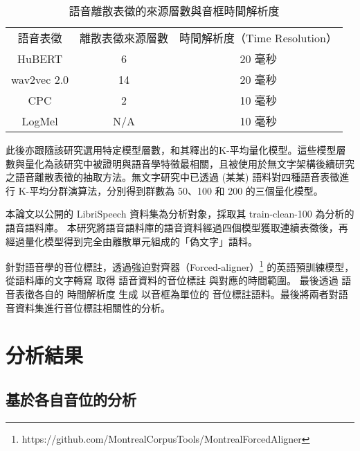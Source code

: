 \begin{table}
    \centering
    \begin{tabular}{ccc}
         語音表徵&  離散表徵來源層數& 時間解析度（Time Resolution）\\
         HuBERT      
&  6& 20 毫秒\\
         wav2vec 2.0 
&  14& 20 毫秒\\
         CPC         
&  2& 10 毫秒\\
         LogMel      &  N/A& 10 毫秒\\
    \end{tabular}
    \caption{語音離散表徵的來源層數與音框時間解析度}
    \label{tab:model-info}
\end{table}
此後亦跟隨該研究選用特定模型層數，和其釋出的K-平均量化模型。這些模型層數與量化為該研究中被證明與語音學特徵最相關，且被使用於無文字架構後續研究之語音離散表徵的抽取方法。無文字研究中已透過 (某某) 語料對四種語音表徵進行 K-平均分群演算法，分別得到群數為 50、100 和 200 的三個量化模型。

        本論文以公開的 LibriSpeech 資料集為分析對象，採取其 train-clean-100 為分析的語音語料庫。
本研究將語音語料庫的語音資料經過四個模型獲取連續表徵後，再經過量化模型得到完全由離散單元組成的「偽文字」語料。

        針對語音學的音位標註，透過強迫對齊器（Forced-aligner）\footnote{https://github.com/MontrealCorpusTools/Montreal­Forced­Aligner } 的英語預訓練模型， 從語料庫的文字轉寫 取得 語音資料的音位標註 與對應的時間範圍。 最後透過 語音表徵各自的 時間解析度 生成 以音框為單位的 音位標註語料。最後將兩者對語音資料集進行音位標註相關性的分析。

\section{分析結果}


\subsection{基於各自音位的分析}

